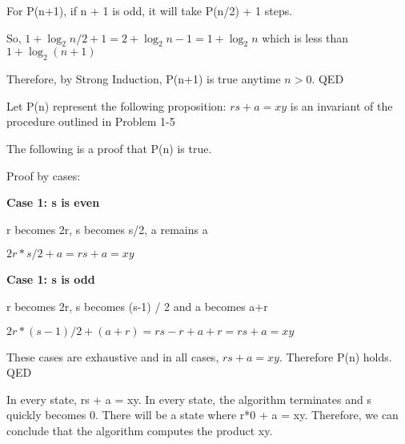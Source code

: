 \documentclass{6042}
\begin{document}
For P(n+1), if n + 1 is odd, it will take P(n/2) + 1 steps.

So, $1 + \log_2{n/2} + 1 = 2 + \log_2{n} - 1 = 1 + \log_2{n}$ which is less than $1 + \log_2{(n+1)}$

Therefore, by Strong Induction, P(n+1) is true anytime $n > 0$. QED


Let P(n) represent the following proposition: $rs + a = xy$ is an invariant of the procedure outlined in Problem 1-5

The following is a proof that P(n) is true.

Proof by cases:

\textbf{Case 1: s is even}

r becomes 2r, s becomes s/2, a remains a

$2r * s/2 + a = rs + a = xy$

\textbf{Case 1: s is odd}

r becomes 2r, s becomes (s-1) / 2 and a becomes a+r

$2r * (s-1)/2 + (a+r) = rs -r + a + r = rs + a = xy$

These cases are exhaustive and in all cases, $rs + a = xy$. Therefore P(n) holds. QED

In every state, rs + a = xy. In every state, the algorithm terminates and s quickly becomes 0. There will be a state where r*0 + a = xy.
Therefore, we can conclude that the algorithm computes the product xy.
\end{document}
